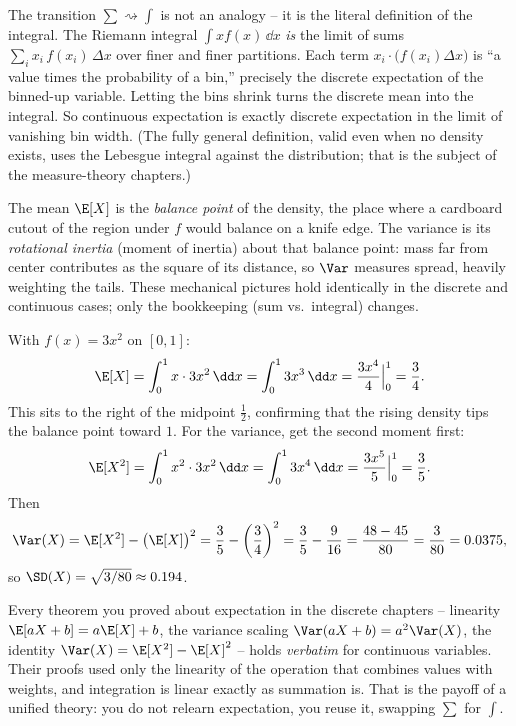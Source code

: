 \begin{connectionbox}
The transition $\sum \rightsquigarrow \int$ is not an analogy -- it is the literal
definition of the integral. The Riemann integral $\int x f(x)\,\dd x$ \emph{is} the
limit of sums $\sum_i x_i\, f(x_i)\,\Delta x$ over finer and finer partitions. Each
term $x_i \cdot \big(f(x_i)\Delta x\big)$ is ``a value times the probability of a
bin,'' precisely the discrete expectation of the binned-up variable. Letting the
bins shrink turns the discrete mean into the integral. So continuous expectation is
exactly discrete expectation in the limit of vanishing bin width. (The fully
general definition, valid even when no density exists, uses the Lebesgue integral
against the distribution; that is the subject of the measure-theory chapters.)
\end{connectionbox}

\begin{intuitionbox}
The mean $\E[X]$ is the \emph{balance point} of the density, the place where a
cardboard cutout of the region under $f$ would balance on a knife edge. The variance
is its \emph{rotational inertia} (moment of inertia) about that balance point: mass
far from center contributes as the square of its distance, so $\Var$ measures spread,
heavily weighting the tails. These mechanical pictures hold identically in the
discrete and continuous cases; only the bookkeeping (sum vs.\ integral) changes.
\end{intuitionbox}

\begin{example}[Mean and variance of $f=3x^2$]
\label{ch10:ex-EV}
With $f(x)=3x^2$ on $[0,1]$:
\[
  \E[X] = \int_0^1 x\cdot 3x^2 \,\dd x = \int_0^1 3x^3 \,\dd x
        = \frac{3x^4}{4}\Big|_0^1 = \frac34 .
\]
This sits to the right of the midpoint $\tfrac12$, confirming that the rising
density tips the balance point toward $1$. For the variance, get the second moment
first:
\[
  \E[X^2] = \int_0^1 x^2 \cdot 3x^2 \,\dd x = \int_0^1 3x^4 \,\dd x
          = \frac{3x^5}{5}\Big|_0^1 = \frac35 .
\]
Then
\[
  \Var(X) = \E[X^2] - \big(\E[X]\big)^2 = \frac35 - \left(\frac34\right)^2
          = \frac35 - \frac{9}{16} = \frac{48 - 45}{80} = \frac{3}{80}
          = 0.0375,
\]
so $\SD(X) = \sqrt{3/80} \approx 0.194$.
\end{example}

\begin{aestheticbox}
Every theorem you proved about expectation in the discrete chapters -- linearity
$\E[aX+b] = a\E[X]+b$, the variance scaling $\Var(aX+b) = a^2\Var(X)$, the identity
$\Var(X)=\E[X^2]-\E[X]^2$ -- holds \emph{verbatim} for continuous variables. Their
proofs used only the linearity of the operation that combines values with weights,
and integration is linear exactly as summation is. That is the payoff of a unified
theory: you do not relearn expectation, you reuse it, swapping $\sum$ for $\int$.
\end{aestheticbox}

